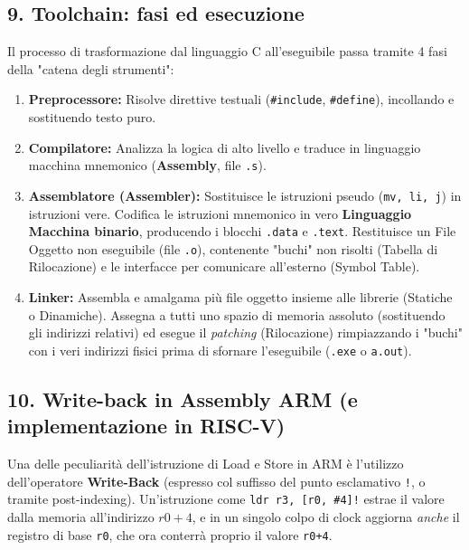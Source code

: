\documentclass[12pt, a4paper]{article}
\begin{document}
\newpage

\subsection{9. Toolchain: fasi ed esecuzione}
Il processo di trasformazione dal linguaggio C all'eseguibile passa tramite 4 fasi della "catena degli strumenti":
\begin{enumerate}
    \item \textbf{Preprocessore:} Risolve direttive testuali (\texttt{\#include}, \texttt{\#define}), incollando e sostituendo testo puro.
    \item \textbf{Compilatore:} Analizza la logica di alto livello e traduce in linguaggio macchina mnemonico (\textbf{Assembly}, file \texttt{.s}). 
    \item \textbf{Assemblatore (Assembler):} Sostituisce le istruzioni pseudo (\texttt{mv, li, j}) in istruzioni vere. Codifica le istruzioni mnemonico in vero \textbf{Linguaggio Macchina binario}, producendo i blocchi \texttt{.data} e \texttt{.text}. Restituisce un File Oggetto non eseguibile (file \texttt{.o}), contenente "buchi" non risolti (Tabella di Rilocazione) e le interfacce per comunicare all'esterno (Symbol Table).
    \item \textbf{Linker:} Assembla e amalgama più file oggetto insieme alle librerie (Statiche o Dinamiche). Assegna a tutti uno spazio di memoria assoluto (sostituendo gli indirizzi relativi) ed esegue il \textit{patching} (Rilocazione) rimpiazzando i "buchi" con i veri indirizzi fisici prima di sfornare l'eseguibile (\texttt{.exe} o \texttt{a.out}).
\end{enumerate}

\subsection{10. Write-back in Assembly ARM (e implementazione in RISC-V)}
Una delle peculiarità dell'istruzione di Load e Store in ARM è l'utilizzo dell'operatore \textbf{Write-Back} (espresso col suffisso del punto esclamativo \texttt{!}, o tramite post-indexing).
Un'istruzione come \texttt{ldr r3, [r0, \#4]!} estrae il valore dalla memoria all'indirizzo $r0+4$, e in un singolo colpo di clock aggiorna \textit{anche} il registro di base \texttt{r0}, che ora conterrà proprio il valore \texttt{r0+4}.
\end{document}
